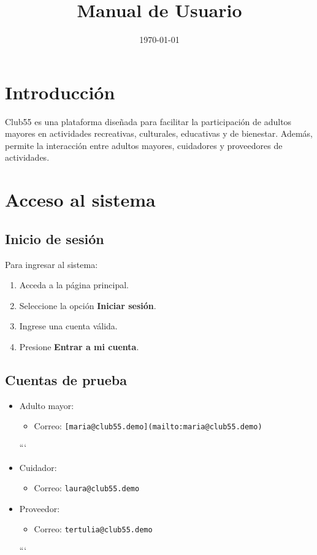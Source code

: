 \documentclass[12pt,a4paper]{article}
\title{Manual de Usuario\Club55}
\author{}
\date{\today}
\begin{document}
\maketitle

\tableofcontents
\newpage

\section{Introducción}

Club55 es una plataforma diseñada para facilitar la participación de adultos mayores en actividades recreativas, culturales, educativas y de bienestar. Además, permite la interacción entre adultos mayores, cuidadores y proveedores de actividades.

\section{Acceso al sistema}

\subsection{Inicio de sesión}

Para ingresar al sistema:

\begin{enumerate}
\item Acceda a la página principal.
\item Seleccione la opción \textbf{Iniciar sesión}.
\item Ingrese una cuenta válida.
\item Presione \textbf{Entrar a mi cuenta}.
\end{enumerate}

\subsection{Cuentas de prueba}

\begin{itemize}
\item Adulto mayor:
\begin{itemize}
\item Correo: \texttt{[maria@club55.demo](mailto:maria@club55.demo)}
\end{itemize}

```
\item Cuidador:
\begin{itemize}
    \item Correo: \texttt{laura@club55.demo}
\end{itemize}

\item Proveedor:
\begin{itemize}
    \item Correo: \texttt{tertulia@club55.demo}
\end{itemize}
```

\end{itemize}
\end{document}
